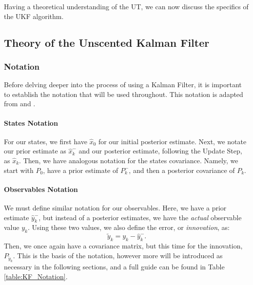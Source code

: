     Having a theoretical understanding of the UT, we can now discuss the specifics of the UKF algorithm.
    
    \subsection{Theory of the Unscented Kalman Filter} \label{section:UKF_Theory}
    
    \subsubsection{Notation}
    Before delving deeper into the process of using a Kalman Filter, it is important to establish the notation that will be used throughout. This notation is adapted from \cite{SimonHaykinText} and \cite{VanMereChapter}.
    \paragraph{States Notation}
    For our states, we first have $\hat{x}_0$ for our initial posterior estimate. Next, we notate our prior estimate as $\hat{x}_k^-$ and our posterior estimate, following the Update Step, as $\hat{x}_k$. Then, we have analogous notation for the states covariance. Namely, we start with $P_0$, have a prior estimate of $P_k^-$, and then a posterior covariance of $P_k$.
    \paragraph{Observables Notation}
    We must define similar notation for our observables. Here, we have a prior estimate $\hat{y}_k^-$, but instead of a posterior estimates, we have the \emph{actual} observable value $y_k$. Using these two values, we also define the error, or \emph{innovation}, as:
    \begin{equation}
    \tilde{y}_k = y_k - \hat{y}_k^-.    
    \end{equation}
    Then, we once again have a covariance matrix, but this time for the innovation, $P_{\tilde{y}_k}$. This is the basis of the notation, however more will be introduced as necessary in the following sections, and a full guide can be found in Table \ref{table:KF_Notation}.
    
